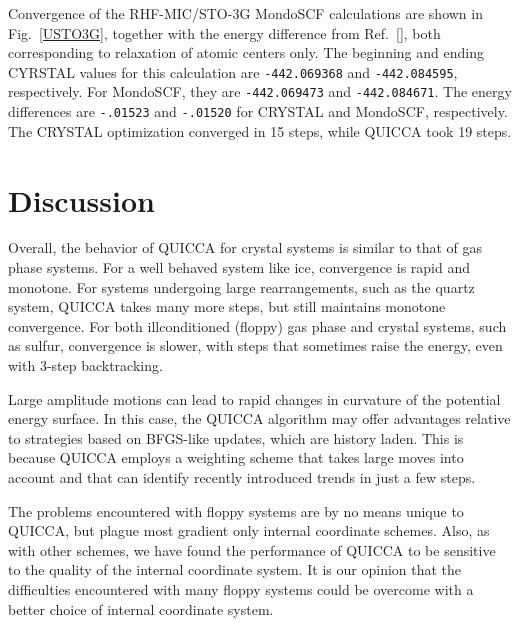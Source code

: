 \twolinestyle{\documentclass[prb,preprint]{revtex4}}
\begin{document}
Convergence of the RHF-MIC/STO-3G {\sc MondoSCF} calculations are shown in Fig.~\ref{USTO3G}, together
with the energy difference from Ref.~[], both corresponding to 
relaxation of atomic centers only.   The beginning and ending {\sc CYRSTAL} values for this 
calculation are {\tt -442.069368} and {\tt -442.084595}, respectively.  For {\sc MondoSCF},
they are {\tt -442.069473} and {\tt -442.084671}.  The energy differences are {\tt -.01523} and
{\tt -.01520} for {\sc CRYSTAL} and {\sc MondoSCF}, respectively.  The {\sc CRYSTAL} optimization
converged in 15 steps, while QUICCA took 19 steps.

\section{Discussion}\label{discussion}

Overall,  the behavior of QUICCA for crystal systems is similar to that of gas phase systems. 
For a well behaved system like ice, convergence is rapid and monotone. 
For systems undergoing large rearrangements, such as the quartz system, QUICCA
takes many more steps, but still maintains monotone convergence.
For both illconditioned (floppy)  gas phase and crystal systems, such as 
sulfur, convergence is slower, with steps that sometimes raise the energy, 
even with 3-step backtracking.

Large amplitude motions can lead to rapid changes in curvature of the 
potential energy surface.  In this case, the QUICCA algorithm may offer
advantages relative to strategies based on BFGS-like updates, which are 
history laden.   This is because QUICCA employs a weighting scheme that 
takes large moves into account and that can identify recently introduced
trends in just a few steps.

The problems encountered with floppy systems are by no means unique to QUICCA,
but plague most gradient only internal coordinate schemes.  Also, as with other
schemes, we have found the performance of QUICCA to be sensitive to the quality 
of the internal coordinate system.  It is our opinion that the difficulties 
encountered with many floppy systems could be overcome with a better choice
of internal coordinate system.  

\end{document}
